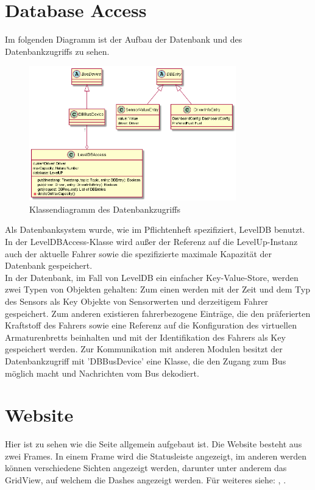 \documentclass[entwurf.tex]{subfiles}
\begin{document}
  	\section{Database Access}
  		Im folgenden Diagramm ist der Aufbau der Datenbank und des Datenbankzugriffs zu sehen.
  		\begin{figure}[H]
  			\begin{center}
 				\includegraphics[width=0.8\textwidth]{diagrams/DBAccess.png}
  				\caption{Klassendiagramm des Datenbankzugriffs}
  			\end{center}
  		\end{figure}
  	Als Datenbanksystem wurde, wie im Pflichtenheft spezifiziert, LevelDB benutzt. In der LevelDBAccess-Klasse wird außer der Referenz auf die LevelUp-Instanz auch der aktuelle Fahrer sowie die spezifizierte maximale Kapazität der Datenbank gespeichert. \\ In der Datenbank, im Fall von LevelDB ein einfacher Key-Value-Store, werden zwei Typen von Objekten gehalten: Zum einen werden mit der Zeit und dem Typ des Sensors als Key Objekte von Sensorwerten und derzeitigem Fahrer gespeichert. Zum anderen existieren fahrerbezogene Einträge, die den präferierten Kraftstoff des Fahrers sowie eine Referenz auf die Konfiguration des virtuellen Armaturenbretts beinhalten und mit der Identifikation des Fahrers als Key gespeichert werden. Zur Kommunikation mit anderen Modulen besitzt der Datenbankzugriff mit 'DBBusDevice' eine Klasse, die den Zugang zum Bus möglich macht und Nachrichten vom Bus dekodiert. 
  	

	\newpage
  	\section{Website}
  	\label{Class:Website}
		Hier ist zu sehen wie die Seite allgemein aufgebaut ist. Die Website besteht aus zwei Frames. In einem Frame wird die Statusleiste angezeigt, im anderen werden können verschiedene Sichten angezeigt werden, darunter unter anderem das GridView, auf welchem die Dashes angezeigt werden. Für weiteres siehe: , .
		
\end{document}
